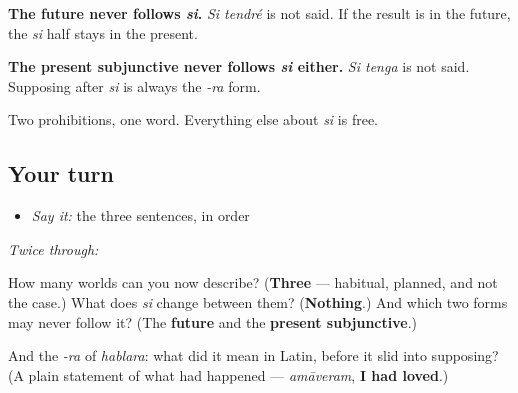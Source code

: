 \begin{grammarlens}[title={Grammar Lens: the two rules that never bend}]
\textbf{The future never follows \emph{si}.} \emph{Si tendré} is not said. If the result is in the future, the \emph{si} half stays in the present.

\textbf{The present subjunctive never follows \emph{si} either.} \emph{Si tenga} is not said. Supposing after \emph{si} is always the \emph{-ra} form.

Two prohibitions, one word. Everything else about \emph{si} is free.
\end{grammarlens}

\subsection*{Your turn}
\begin{itemize}
\raggedright
  \item \emph{Say it:} the three sentences, in order
\end{itemize}

\emph{Twice through:}

\begin{tcolorbox}[breakable,colback=teal!4,colframe=teal!35!black,title={Before you move on}]
How many worlds can you now describe? (\textbf{Three} — habitual, planned, and not the case.) What does \emph{si} change between them? (\textbf{Nothing}.) And which two forms may never follow it? (The \textbf{future} and the \textbf{present subjunctive}.)

And the \emph{-ra} of \emph{hablara}: what did it mean in Latin, before it slid into supposing? (A plain statement of what had happened — \emph{amāveram}, \textbf{I had loved}.)
\end{tcolorbox}
